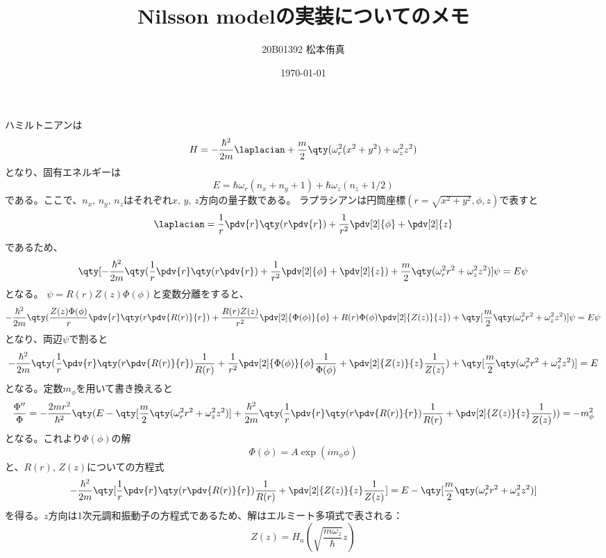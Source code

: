 \documentclass[a4paper,11pt,uplatex]{jsarticle}%
\title{Nilsson modelの実装についてのメモ}
\author{20B01392 松本侑真}
\date{\today}
\begin{document}
\maketitle
\begin{abstract}

\end{abstract}
\tableofcontents
\newpage
ハミルトニアンは
\begin{equation}
  H = -\frac{\hbar^2}{2m}\laplacian + \frac{m}{2}\qty(\omega_r^2(x^2+y^2) + \omega_z^2z^2)
\end{equation}
となり、固有エネルギーは
\begin{equation}
  E = \hbar\omega_r(n_x+n_y+1) + \hbar\omega_z(n_z+1/2)
\end{equation}
である。ここで、$n_x,\,n_y,\,n_z$はそれぞれ$x,\,y,\,z$方向の量子数である。
ラプラシアンは円筒座標$(r=\sqrt{x^2+y^2},\phi,z)$で表すと
\begin{equation}
  \laplacian = \frac{1}{r}\pdv{r}\qty(r\pdv{r})+ \frac{1}{r^2}\pdv[2]{\phi} + \pdv[2]{z}
\end{equation}
であるため、
\begin{equation}
  \qty[-\frac{\hbar^2}{2m}\qty(\frac{1}{r}\pdv{r}\qty(r\pdv{r})+ \frac{1}{r^2}\pdv[2]{\phi} + \pdv[2]{z}) + \frac{m}{2}\qty(\omega_r^2r^2 + \omega_z^2z^2)]\psi = E\psi
\end{equation}
となる。
$\psi = R(r)Z(z)\Phi(\phi)$と変数分離をすると、
\begin{equation}
  -\frac{\hbar^2}{2m}\qty(\frac{Z(z)\Phi(\phi)}{r}\pdv{r}\qty(r\pdv{R(r)}{r})+ \frac{R(r)Z(z)}{r^2}\pdv[2]{\Phi(\phi)}{\phi} + R(r)\Phi(\phi)\pdv[2]{Z(z)}{z}) 
  + \qty[\frac{m}{2}\qty(\omega_r^2r^2 + \omega_z^2z^2)]\psi = E\psi
\end{equation}
となり、両辺$\psi$で割ると
\begin{equation}
  -\frac{\hbar^2}{2m}\qty(\frac{1}{r}\pdv{r}\qty(r\pdv{R(r)}{r})\frac{1}{R(r)} + \frac{1}{r^2}\pdv[2]{\Phi(\phi)}{\phi}\frac{1}{\Phi(\phi)} + \pdv[2]{Z(z)}{z}\frac{1}{Z(z)}) 
  + \qty[\frac{m}{2}\qty(\omega_r^2r^2 + \omega_z^2z^2)] = E
\end{equation}
となる。定数$m_{\phi}$を用いて書き換えると
\begin{equation}
  \frac{\Phi''}{\Phi} = -\frac{2mr^2}{\hbar^2}\qty(E -\qty[\frac{m}{2}\qty(\omega_r^2r^2 + \omega_z^2z^2)] +\frac{\hbar^2}{2m}\qty(\frac{1}{r}\pdv{r}\qty(r\pdv{R(r)}{r})\frac{1}{R(r)} + \pdv[2]{Z(z)}{z}\frac{1}{Z(z)})) = -m_{\phi}^2
\end{equation}
となる。これより$\Phi(\phi)$の解
\begin{equation}
  \Phi(\phi) = A\exp(im_{\phi}\phi)
\end{equation}
と、$R(r),\,Z(z)$についての方程式
\begin{equation}
  -\frac{\hbar^2}{2m}\qty[\frac{1}{r}\pdv{r}\qty(r\pdv{R(r)}{r})\frac{1}{R(r)} + \pdv[2]{Z(z)}{z}\frac{1}{Z(z)}] = E -\qty[\frac{m}{2}\qty(\omega_r^2r^2 + \omega_z^2z^2)]
\end{equation}
を得る。$z$方向は1次元調和振動子の方程式であるため、解はエルミート多項式で表される：
\begin{equation}
  Z(z) = H_n(\sqrt{\frac{m\omega_z}{\hbar}}z)
\end{equation}
\end{document}
